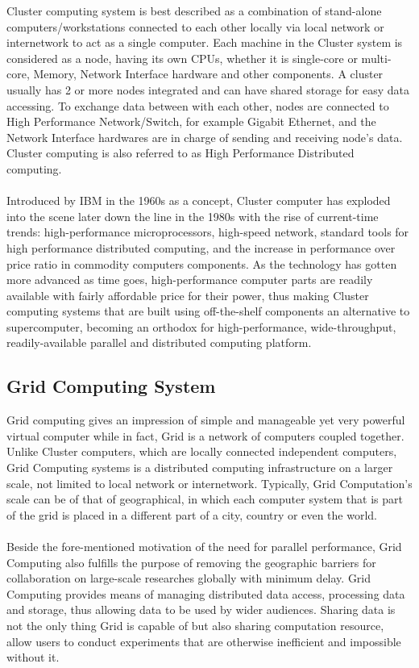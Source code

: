 Cluster computing system is best described as a combination of stand-alone computers/workstations connected to each other locally via local network or internetwork to act as a single computer. Each machine in the Cluster system is considered as a node, having its own CPUs, whether it is single-core or multi-core, Memory, Network Interface hardware and other components. A cluster usually has 2 or more nodes integrated and can have shared storage for easy data accessing. To exchange data between with each other, nodes are connected to High Performance Network/Switch, for example Gigabit Ethernet, and the Network Interface hardwares are in charge of sending and receiving node's data. Cluster computing is also referred to as High Performance Distributed computing. \\
~\\
Introduced by IBM in the 1960s as a concept, Cluster computer has exploded into the scene later down the line in the 1980s with the rise of current-time trends: high-performance microprocessors, high-speed network, standard tools for high performance distributed computing, and the increase in performance over price ratio in commodity computers components. As the technology has gotten more advanced as time goes, high-performance computer parts are readily available with fairly affordable price for their power, thus making Cluster computing systems that are built using off-the-shelf components an alternative to supercomputer, becoming an orthodox for high-performance, wide-throughput, readily-available parallel and distributed computing platform. \\

\subsection{Grid Computing System}

Grid computing gives an impression of simple and manageable yet very powerful virtual computer while in fact, Grid is a network of computers coupled together. Unlike Cluster computers, which are locally connected independent computers, Grid Computing systems is a distributed computing infrastructure on a larger scale, not limited to local network or internetwork. Typically, Grid Computation's scale can be of that of geographical, in which each computer system that is part of the grid is placed in a different part of a city, country or even the world. \\
~\\
Beside the fore-mentioned motivation of the need for parallel performance, Grid Computing also fulfills the purpose of removing the geographic barriers for collaboration on large-scale researches globally with minimum delay. Grid Computing provides means of managing distributed data access, processing data and storage, thus allowing data to be used by wider audiences. Sharing data is not the only thing Grid is capable of but also sharing computation resource, allow users to conduct experiments that are otherwise inefficient and impossible without it. \\


